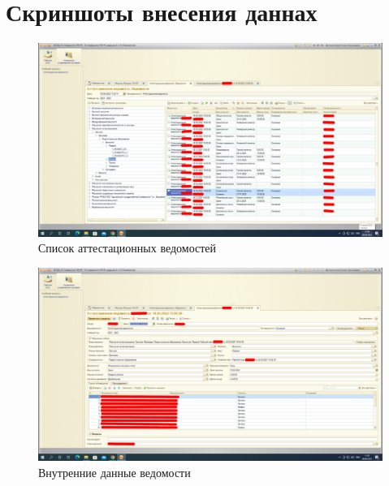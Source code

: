 \documentclass[12pt,a4paper]{scrartcl}
\begin{document}
\section{Скриншоты внесения даннах}
\label{sec:picexample}
\begin{figure}[h]
	\centering
	\includegraphics[width=0.8 \textwidth]{ris1.jpg}
	\caption{Список аттестационных ведомостей}\label{fig:par}
\end{figure}
\begin{figure}[h]
	\centering
	\includegraphics[width=0.8 \textwidth]{ris2.jpg}
	\caption{Внутренние данные ведомости}\label{fig:par}
\end{figure}
\end{document}
